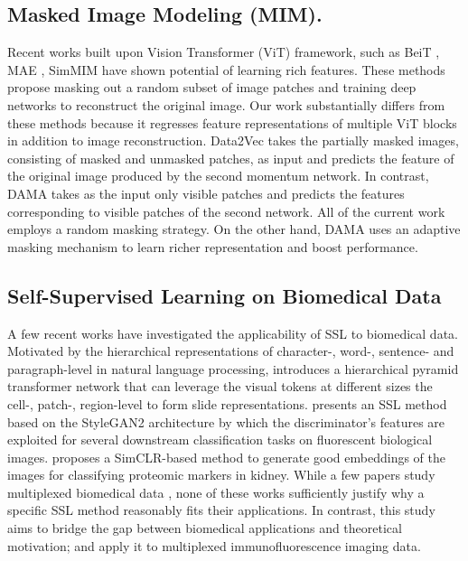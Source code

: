 \documentclass[10pt,twocolumn,letterpaper]{article}
\begin{document}
\subsection{Masked Image Modeling (MIM).} Recent works built upon Vision Transformer (ViT) \cite{vit} framework, such as BeiT \cite{beit}, MAE \cite{mae}, SimMIM \cite{simmim} have shown potential of learning rich features. These methods propose masking out a random subset of image patches and training deep networks to reconstruct the original image. Our work substantially differs from these methods because it regresses feature representations of multiple ViT blocks in addition to image reconstruction. Data2Vec \cite{data2vec} takes the partially masked images, consisting of masked and unmasked patches, as input and predicts the feature of the original image produced by the second momentum network. In contrast, DAMA takes as the input only visible patches and predicts the features corresponding to visible patches of the second network. All of the current work employs a random masking strategy. On the other hand, DAMA uses an adaptive masking mechanism to learn richer representation and boost performance.

\subsection{Self-Supervised Learning on Biomedical Data} \label{subsec:biomedical}
A few recent works have investigated the applicability of SSL to biomedical data. Motivated by the hierarchical representations of character-, word-, sentence- and paragraph-level in natural language processing, \cite{cell6} introduces a hierarchical pyramid transformer network that can leverage the visual tokens at different sizes the  cell-,  patch-,  region-level to form slide representations. \cite{cell4} presents an SSL method based on the StyleGAN2 architecture by which the discriminator’s features are exploited for several downstream classification tasks on fluorescent biological images. \cite{cell5} proposes a SimCLR-based method to generate good embeddings of the images for classifying proteomic markers in kidney. While a few papers study multiplexed biomedical data \cite{cell4,cell5}, none of these works sufficiently justify why a specific SSL method reasonably fits their applications. In contrast, this study aims to bridge the gap between biomedical applications and theoretical motivation; and apply it to multiplexed immunofluorescence imaging data.
\end{document}
